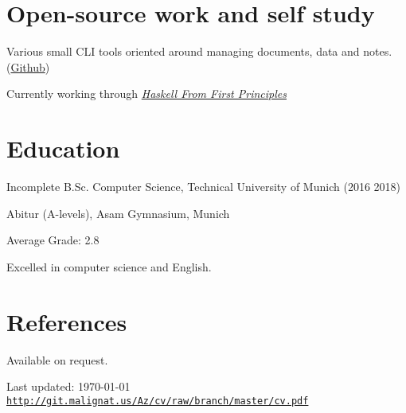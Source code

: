 \documentclass[a4paper]{article}
\def\footerlink{http://git.malignat.us/Az/cv/raw/branch/master/cv.pdf}
\renewenvironment{itemize}{
  \begin{list}{}{
    \setlength{\leftmargin}{1.5em}
  }
}{
  \end{list}
}
\newenvironment{packed}{
\begin{itemize}
  \setlength{\itemsep}{0pt}
  \setlength{\parskip}{0pt}
  \setlength{\parsep}{0pt}
}{\end{itemize}}
\begin{document}
\section*{Open-source work and self study}

\begin{itemize}
  \item Various small CLI tools oriented around managing documents, data and
    notes. (\href{https://github.com/MordecaiMalignatus?utf8=\%E2\%9C\%93\&tab=q\&repositories=\&type=public\&language=}{Github})
  \item Currently working through \href{http://haskellbook.com}{\emph{Haskell From First Principles}}
\end{itemize}

\section*{Education}

\begin{itemize}
  \item Incomplete B.Sc. Computer Science, Technical University of Munich (2016
    {\textendash} 2018)

  \item Abitur (A-levels), Asam Gymnasium, Munich
	\begin{packed}
	\item Average Grade: 2.8
	\item Excelled in computer science and English.
	\end{packed}
\end{itemize}


\section*{References}
Available on request.

\vfill

\begin{center}
  \begin{footnotesize}
    Last updated: \today \\
    \href{\footerlink}{\texttt{\footerlink}}
  \end{footnotesize}
\end{center}
\end{document}
